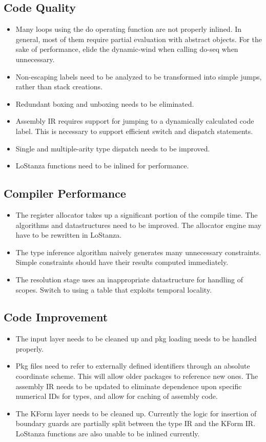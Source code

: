 \documentclass[fleqn, 12pt]{article}
\begin{document}
\subsection*{Code Quality}
\begin{itemize}
\item Many loops using the do operating function are not properly inlined. In general, most of them require partial evaluation with abstract objects. For the sake of performance, elide the dynamic-wind when calling do-seq when unnecessary.
\item Non-escaping labels need to be analyzed to be transformed into simple jumps, rather than stack creations.
\item Redundant boxing and unboxing needs to be eliminated. 
\item Assembly IR requires support for jumping to a dynamically calculated code label. This is necessary to support efficient switch and dispatch statements. 
\item Single and multiple-arity type dispatch needs to be improved. 
\item LoStanza functions need to be inlined for performance.
\end{itemize}

\subsection*{Compiler Performance}
\begin{itemize}
\item The register allocator takes up a significant portion of the compile time. The algorithms and datastructures need to be improved. The allocator engine may have to be rewritten in LoStanza.
\item The type inference algorithm naively generates many unnecessary constraints. Simple constraints should have their results computed immediately.
\item The resolution stage uses an inappropriate datastructure for handling of scopes. Switch to using a table that exploits temporal locality. 
\end{itemize}

\subsection*{Code Improvement}
\begin{itemize}
\item The input layer needs to be cleaned up and pkg loading needs to be handled properly.
\item Pkg files need to refer to externally defined identifiers through an absolute coordinate scheme. This will allow older packages to reference new ones. The assembly IR needs to be updated to eliminate dependence upon specific numerical IDs for types, and allow for caching of assembly code.
\item The KForm layer needs to be cleaned up. Currently the logic for insertion of boundary guards are partially split between the type IR and the KForm IR. LoStanza functions are also unable to be inlined currently. 
\end{itemize}
\end{document}
